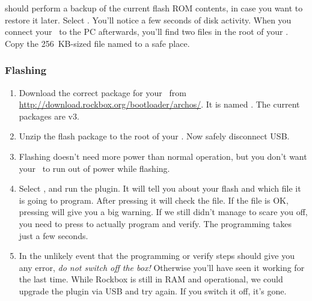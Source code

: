  should perform a
backup of the current flash ROM contents, in case you want to restore it later.
Select . You'll notice a few seconds of disk activity. When you connect your
\dap\ to the PC afterwards, you'll find two files in the root of your \dap.
Copy the 256~KB-sized file named  to
a safe place.

\subsubsection{Flashing}

\begin{enumerate}
\item Download the correct package for your \dap\ from
  \url{http://download.rockbox.org/bootloader/archos/}. It is named
  .
  The current packages are v3.
\item Unzip the flash package to the root of your \dap.
  Now safely disconnect USB.
\item
  Flashing doesn't need more power than normal operation, but you don't want
  your \dap\ to run out of power while flashing.
\item Select , and run the
   plugin. It will tell you about your flash and
  which file it is going to program. After pressing
  it will check the file. If the file is OK, pressing
  will give you a big warning. If we still didn't manage to scare you off, you
  need to press 
  to actually program and verify. The programming takes just a few seconds.
\item In the unlikely event that the programming or verify steps should give
  you any error, \emph{do not switch off the box!} Otherwise you'll have seen
  it working for the last time. While Rockbox is still in RAM and operational,
  we could upgrade the plugin via USB and try again. If you switch it off,
  it's gone.
\end{enumerate}


